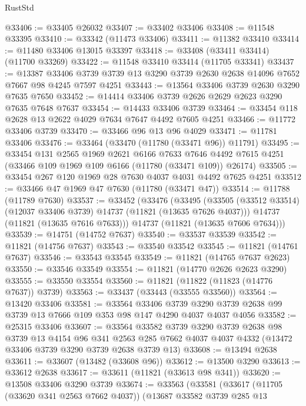 \begin{lexlean}{RustStd}
\begin{coremodule}
@33406 := @33405 @26032
@33407 := @33402 @33406
@33408 := @11548 @33395
@33410 := @33342 (@11473 @33406)
@33411 := @11382 @33410
@33414 := @11480 @33406 @13015 @33397
@33418 := @33408 (@33411 @33414) (@11700 @33269)
@33422 := @11548 @33410 @33414 (@11705 @33341)
@33437 := @13387
    @33406
    @3739
    @3739
    @13
    @3290
    @3739
    @2630
    @2638
    @14096
    @7652
    @7667
    @98
    @4245
    @7597
    @4251
@33443 := @13564 @33406 @3739 @2630 @3290 @7635 @7650
@33452 := @14414 @33406 @3739 @2626 @2629 @2623 @3290 @7635 @7648 @7637
@33454 := @14433 @33406 @3739
@33464 := @33454 @118 @2628 @13 @2622 @4029 @7634 @7647 @4492 @7605 @4251
@33466 := @11772 @33406 @3739
@33470 := @33466 @96 @13 @96 @4029
@33471 := @11781 @33406
@33476 := @33464 (@33470 (@11780 (@33471 @96)) @11791)
@33495 := @33454
    @131
    @2565
    @1969
    @2621
    @6166
    @7633
    @7646
    @4492
    @7615
    @4251
    (@33466 @109 @1969 @109 @6166 (@11780 (@33471 @109)) @26174)
@33505 := @33454 @267 @120 @1969 @28 @7630 @4037 @4031 @4492 @7625 @4251
@33512 := @33466 @47 @1969 @47 @7630 (@11780 (@33471 @47))
@33514 := @11788 (@11789 @7630)
@33537 := @33452
    (@33476
      (@33495
        (@33505 (@33512 @33514) (@12037 @33406 @3739) @14737 (@11821 (@13635 @7626 @4037)))
        @14737
        (@11821 (@13635 @7616 @7633)))
      @14737
      (@11821 (@13635 @7606 @7634)))
@33539 := @14751 (@14752 @7637)
@33540 := @33537 @33539
@33542 := @11821 (@14756 @7637)
@33543 := @33540 @33542
@33545 := @11821 (@14761 @7637)
@33546 := @33543 @33545
@33549 := @11821 (@14765 @7637 @2623)
@33550 := @33546 @33549
@33554 := @11821 (@14770 @2626 @2623 @3290)
@33555 := @33550 @33554
@33560 := @11821 (@11822 (@11823 (@14776 @7637)) @3739)
@33563 := @33437 (@33443 (@33555 @33560))
@33564 := @13420 @33406
@33581 := @33564
    @33406
    @3739
    @3290
    @3739
    @2638
    @99
    @3739
    @13
    @7666
    @109
    @353
    @98
    @147
    @4290
    @4037
    @4037
    @4056
@33582 := @25315 @33406
@33607 := @33564
    @33582
    @3739
    @3290
    @3739
    @2638
    @98
    @3739
    @13
    @4154
    @96
    @341
    @2563
    @285
    @7662
    @4037
    @4037
    @4332
    (@13472 @33406 @3739 @3290 @3739 @2638 @3739 @13)
@33608 := @13494 @2638
@33611 := @33607 (@13482 (@33608 @96))
@33612 := @13500 @3290
@33613 := @33612 @2638
@33617 := @33611 (@11821 (@33613 @98 @341))
@33620 := @13508 @33406 @3290 @3739
@33674 := @33563
    (@33581
      (@33617
        (@11705 (@33620 @341 @2563 @7662 @4037))
        (@13687
          @33582
          @3739
          @285
          @13

\end{coremodule}
\end{lexlean}

